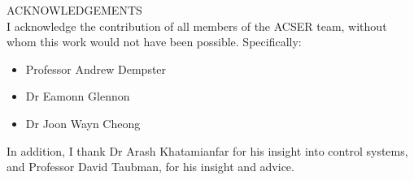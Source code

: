 ACKNOWLEDGEMENTS\\
I acknowledge the contribution of all members of the ACSER team, without whom this work would not have been possible. Specifically:
\begin{itemize}
\item{Professor Andrew Dempster}
\item{Dr Eamonn Glennon}
\item{Dr Joon Wayn Cheong}
\end{itemize}

In addition, I thank Dr Arash Khatamianfar for his insight into control systems, and Professor David Taubman, for his insight and advice.

